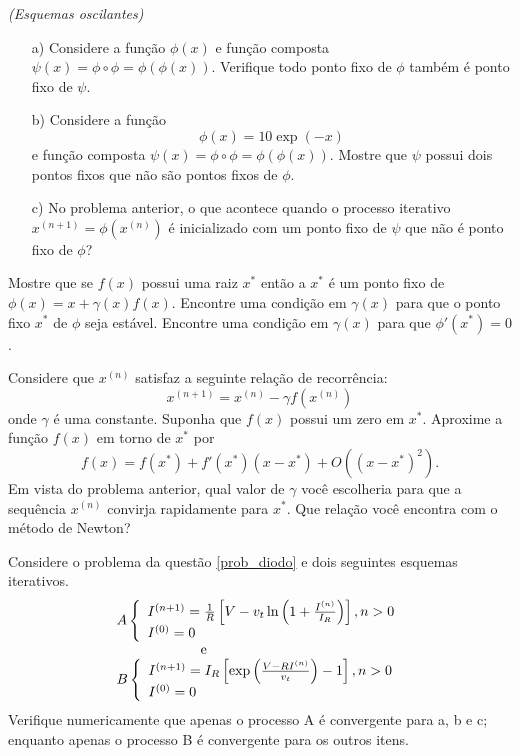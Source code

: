 \begin{Exercise}\it {(Esquemas oscilantes)}
\begin{itemize}
\item[a)] Considere a função $\phi(x)$ e função composta $\psi(x)=\phi\circ \phi=\phi\left(\phi(x)\right)$. Verifique todo ponto fixo de $\phi$ também é ponto fixo de $\psi$.

\item[b)]  Considere a função $$\phi(x)=10\exp(-x)$$ e função composta $\psi(x)=\phi\circ \phi=\phi\left(\phi(x)\right)$. Mostre que $\psi$ possui dois pontos fixos que não são pontos fixos de $\phi$.

\item[c)]  No problema anterior, o que acontece quando o processo iterativo $x^{(n+1)}=\phi(x^{(n)})$ é inicializado com um ponto fixo de $\psi$ que não é ponto fixo de $\phi$?
\end{itemize}
\end{Exercise}

\begin{Exercise}[title= Aceleração de convergência - introdução ao método de Newton]\label{int_new1} Mostre que se $f(x)$ possui uma raiz $x^*$ então a $x^*$ é um ponto fixo de $\phi(x)=x+\gamma(x) f(x)$. Encontre uma condição em $\gamma(x)$ para que o ponto fixo $x^*$ de $\phi$ seja estável. Encontre uma condição em $\gamma(x)$ para que $\phi'(x^*)=0$.
\end{Exercise}

\begin{Exercise}[title=Aceleração de convergência - introdução ao método de Newton]\label{int_new2} Considere que $x^{(n)}$ satisfaz a seguinte relação de recorrência:
$$x^{(n+1)}=x^{(n)} - \gamma f(x^{(n)})$$
onde $\gamma$ é uma constante. Suponha que $f(x)$ possui um zero em $x^*$. Aproxime a função $f(x)$ em torno de $x^*$ por
$$f(x)=f(x^*)+f'(x^*)(x-x^*)+O\left((x-x^*)^2\right).$$
Em vista do problema anterior, qual valor de $\gamma$ você escolheria para que a sequência $x^{(n)}$ convirja rapidamente para $x^*$. Que relação você encontra com o método de Newton?
\end{Exercise}

\begin{Exercise} Considere o problema da questão \ref{prob_diodo} e dois seguintes esquemas iterativos.
$$\begin{array}{l}
A\left\{
\begin{array}{ll}
I^{(n+1)}=\frac{1}{R}\left[V-v_t\ln\left(1+\frac{I^{(n)}}{I_R}\right)\right],n>0\\
I^{(0)}=0
\end{array}\right.\\ \hspace{2cm} \hbox{ e }\\
B\left\{
\begin{array}{ll}
I^{(n+1)}=I_R\left[\exp\left(\frac{V-RI^{(n)}}{v_t}\right)-1\right],n>0\\
I^{(0)}=0
\end{array}\right.
\end{array}
$$
Verifique numericamente que apenas o processo A é convergente para a, b e c; enquanto apenas o processo B é convergente para os outros itens.
\end{Exercise}

